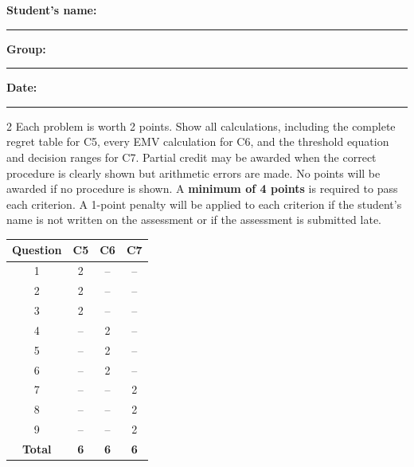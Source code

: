 	\vspace{3mm}
	\noindent
	\textbf{Student's name:} \rule{7cm}{0.4pt}\hfill
	\textbf{Group:} \rule{2cm}{0.4pt}\hfill
	\textbf{Date:} \rule{3cm}{0.4pt}

	\begin{multicols}{2}
		\raggedcolumns
		\vspace{-0.25cm}
		Each problem is worth 2 points. Show all calculations, including the complete regret table for C5, every EMV calculation for C6, and the threshold equation and decision ranges for C7. Partial credit may be awarded when the correct procedure is clearly shown but arithmetic errors are made. No points will be awarded if no procedure is shown.
		A \textbf{minimum of 4 points} is required to pass each criterion. A 1-point penalty will be applied to each criterion if the student's name is not written on the assessment or if the assessment is submitted late.

		\begin{center}
			\begin{tabular}{|c|c|c|c|}
				\hline
				\textbf{Question} & \textbf{C5} & \textbf{C6} & \textbf{C7} \\ \hline
				1 & 2 & -- & -- \\ \hline
				2 & 2 & -- & -- \\ \hline
				3 & 2 & -- & -- \\ \hline
				4 & -- & 2 & -- \\ \hline
				5 & -- & 2 & -- \\ \hline
				6 & -- & 2 & -- \\ \hline
				7 & -- & -- & 2 \\ \hline
				8 & -- & -- & 2 \\ \hline
				9 & -- & -- & 2 \\ \hline
				\textbf{Total} & \textbf{6} & \textbf{6} & \textbf{6} \\ \hline
			\end{tabular}
		\end{center}

		\columnbreak


\end{multicols}
